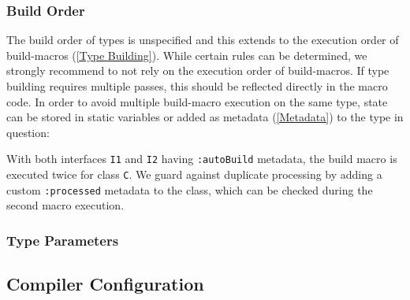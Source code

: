 \documentclass{article}
\newcommand{\type}[1]{\texttt{#1}}
\newcommand{\expr}[1]{\texttt{#1}}
\newcommand{\tref}[2]{#1 (\ref{#2})}
\begin{document}




\subsubsection{Build Order}
\label{Build Order}

The build order of types is unspecified and this extends to the execution order of \tref{build-macros}{Type Building}. While certain rules can be determined, we strongly recommend to not rely on the execution order of build-macros. If type building requires multiple passes, this should be reflected directly in the macro code. In order to avoid multiple build-macro execution on the same type, state can be stored in static variables or added as \tref{metadata}{Metadata} to the type in question:



With both interfaces \type{I1} and \type{I2} having \expr{:autoBuild} metadata, the build macro is executed twice for class \type{C}. We guard against duplicate processing by adding a custom \expr{:processed} metadata to the class, which can be checked during the second macro execution.


\subsubsection{Type Parameters}

\subsection{Compiler Configuration}
\label{Compiler Configuration}
\end{document}
